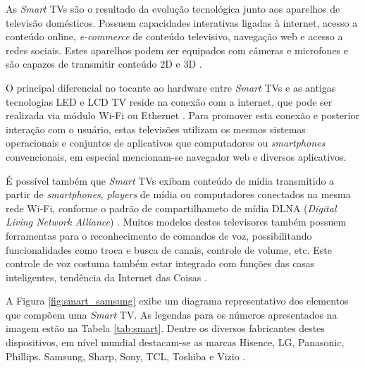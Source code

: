 
As \emph{Smart} TVs são o resultado da evolução tecnológica junto aos aparelhos de televisão domésticos. Possuem capacidades interativas ligadas à internet, acesso a conteúdo online, \emph{e-commerce} de conteúdo televisivo, navegação web e acesso a redes sociais. Estes aparelhos podem ser equipados com câmeras e microfones e são capazes de transmitir conteúdo 2D e 3D \cite{samsung:smarttv,perakakis2015proposed}.

O principal diferencial no tocante ao hardware entre \emph{Smart} TVs e as antigas tecnologias LED e LCD TV reside na conexão com a internet, que pode ser realizada via módulo Wi-Fi ou Ethernet \cite{differencebetween,tomsguid:everythingsmart}. Para promover esta conexão e posterior interação com o usuário, estas televisões utilizam os mesmos sistemas operacionais e conjuntos de aplicativos que computadores ou \emph{smartphones} convencionais, em especial mencionam-se navegador web e diversos aplicativos.

É possível também que \emph{Smart} TVs exibam conteúdo de mídia transmitido a partir de \emph{smartphones}, \emph{players} de mídia ou computadores conectados na mesma rede Wi-Fi, conforme o padrão de compartilhameto de mídia DLNA (\emph{Digital Living Network Alliance}) \cite{michele2014watch,shin2013smart,perakakis2015proposed,whatisasmarttv}. Muitos modelos destes televisores também possuem ferramentas para o reconhecimento de comandos de voz, possibilitando funcionalidades como troca e busca de canais, controle de volume, etc. Este controle de voz costuma também estar integrado com funções das casas inteligentes, tendência da Internet das Coisas \cite{tomsguid:everythingsmart}.

A Figura \ref{fig:smart_samsung} exibe um diagrama representativo dos elementos que compõem uma \emph{Smart} TV. As legendas para os números apresentados na imagem estão na Tabela \ref{tab:smart}. Dentre os diversos fabricantes destes dispositivos, em nível mundial destacam-se as marcas Hisence, LG, Panasonic, Phillips. Samsung, Sharp, Sony, TCL, Toshiba e Vizio \cite{tomsguid:everythingsmart}.

